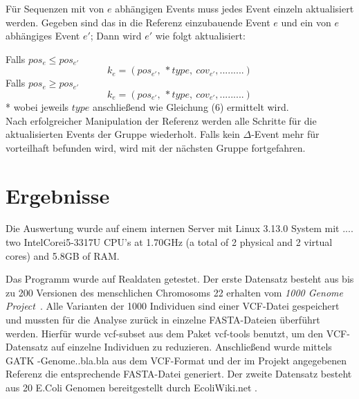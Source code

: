 \documentclass[12pt]{article}
\begin{document}
Für Sequenzen mit von $e$ abhängigen Events muss jedes Event einzeln aktualisiert werden. Gegeben sind das in die Referenz einzubauende Event $e$ und ein von $e$ abhängiges Event $e'$; Dann wird $e'$ wie folgt aktualisiert:

\noindent Falls $pos_{e} \le pos_{e'}$
\begin{equation}
k_{e} = (pos_{e'},~*type,~cov_{e'},.........)
\end{equation}
Falls $pos_{e} \ge pos_{e'}$
\begin{equation}
k_{e} = (pos_{e'},~*type,~cov_{e'},.........)
\end{equation}
* wobei jeweils $type$ anschließend wie Gleichung (6) ermittelt wird.\\

\noindent Nach erfolgreicher Manipulation der Referenz werden alle Schritte für die aktualisierten Events der Gruppe wiederholt. Falls kein $\Delta$-Event mehr für vorteilhaft befunden wird, wird mit der nächsten Gruppe fortgefahren.

\pagebreak
\section{Ergebnisse}
Die Auswertung wurde auf einem internen Server mit Linux 3.13.0 System mit .... two Intel\textregistered Core\texttrademark i5-3317U CPU's at 1.70GHz (a total of 2 physical and 2 virtual cores) and 5.8GB of RAM. 

Das Programm wurde auf Realdaten getestet. Der erste Datensatz besteht aus bis zu 200 Versionen des menschlichen Chromosoms 22 erhalten vom \textit{1000 Genome Project}~\cite{1000genomes}. Alle Varianten der 1000 Individuen sind einer VCF-Datei gespeichert und mussten für die Analyse zurück in einzelne FASTA-Dateien überführt werden. Hierfür wurde vcf-subset aus dem Paket vcf-tools benutzt, um den VCF-Datensatz auf einzelne Individuen zu reduzieren. Anschließend wurde mittels GATK -Genome..bla.bla aus dem VCF-Format und der im Projekt angegebenen Referenz die entsprechende FASTA-Datei generiert. Der zweite Datensatz besteht aus 20 E.Coli Genomen bereitgestellt durch EcoliWiki.net \cite{DATA:ecoli}.
\end{document}
